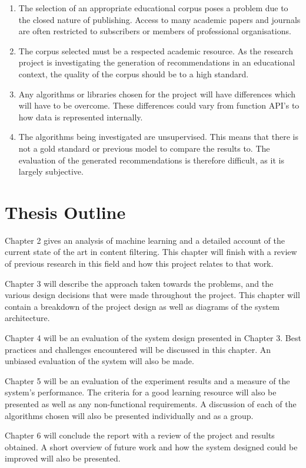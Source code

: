 \begin{enumerate}
    \item The selection of an appropriate educational corpus poses a problem due to the closed nature of publishing.
    Access to many academic papers and journals are often restricted to subscribers or members of professional organisations.

    \item The corpus selected must be a respected academic resource.
    As the research project is investigating the generation of recommendations in an educational context, the quality of the corpus should be to a high standard.

    \item Any algorithms or libraries chosen for the project will have differences which will have to be overcome.
    These differences could vary from function API's to how data is represented internally.

    \item The algorithms being investigated are unsupervised.
    This means that there is not a gold standard or previous model to compare the results to.
    The evaluation of the generated recommendations is therefore difficult, as it is largely subjective.
\end{enumerate}

\section{Thesis Outline}
Chapter 2 gives an analysis of machine learning and a detailed account of the current state of the art in content filtering.
This chapter will finish with a review of previous research in this field and how this project relates to that work.

Chapter 3 will describe the approach taken towards the problems, and the various design decisions that were made throughout the project.
This chapter will contain a breakdown of the project design as well as diagrams of the system architecture.

Chapter 4 will be an evaluation of the system design presented in Chapter 3.
Best practices and challenges encountered will be discussed in this chapter.
An unbiased evaluation of the system will also be made.

Chapter 5 will be an evaluation of the experiment results and a measure of the system's performance.
The criteria for a good learning resource will also be presented as well as any non-functional requirements.
A discussion of each of the algorithms chosen will also be presented individually and as a group.

Chapter 6 will conclude the report with a review of the project and results obtained.
A short overview of future work and how the system designed could be improved will also be presented.
